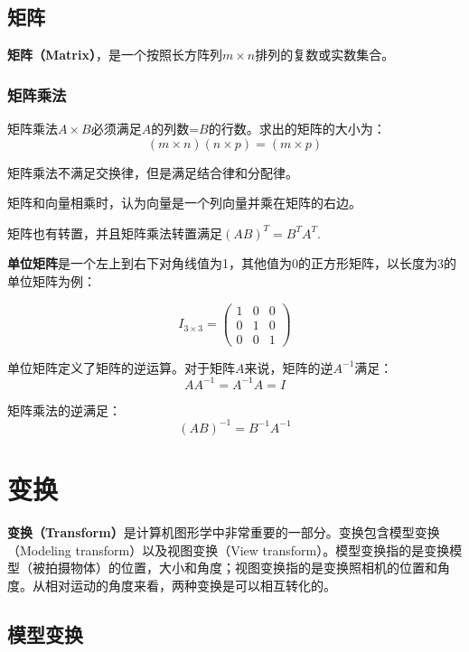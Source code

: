 \documentclass[openany]{progbookcn}
\begin{document}
\section{矩阵}

\textbf{矩阵（Matrix）}，是一个按照长方阵列$m\times n$排列的复数或实数集合。

\subsection{矩阵乘法}

矩阵乘法$A\times B$必须满足$A$的列数=$B$的行数。求出的矩阵的大小为：
\begin{equation}
	(m\times n)(n\times p) = (m\times p)
\end{equation}

矩阵乘法不满足交换律，但是满足结合律和分配律。

矩阵和向量相乘时，认为向量是一个列向量并乘在矩阵的右边。

矩阵也有转置，并且矩阵乘法转置满足$(AB)^T=B^TA^T$.

\textbf{单位矩阵}是一个左上到右下对角线值为1，其他值为0的正方形矩阵，以长度为3的单位矩阵为例：

\begin{equation}
	I_{3\times 3}=\begin{pmatrix}
		1&0&0\\
		0&1&0\\
		0&0&1
	\end{pmatrix}
\end{equation}

单位矩阵定义了矩阵的逆运算。对于矩阵$A$来说，矩阵的逆$A^{-1}$满足：
\begin{equation}
	AA^{-1}=A^{-1}A=I
\end{equation}

矩阵乘法的逆满足：
\begin{equation}
	(AB)^{-1}=B^{-1}A^{-1}
\end{equation}

\chapter{变换}

\textbf{变换（Transform）}是计算机图形学中非常重要的一部分。变换包含模型变换（Modeling transform）以及视图变换（View transform）。模型变换指的是变换模型（被拍摄物体）的位置，大小和角度；视图变换指的是变换照相机的位置和角度。从相对运动的角度来看，两种变换是可以相互转化的。

\section{模型变换}
\end{document}
